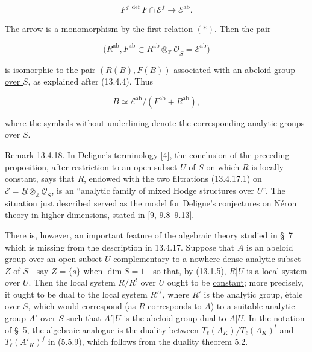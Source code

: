 \begin{equation*}
 \underline F^f\stackrel{\mathrm{def}}{=}
 \underline F\cap\mathcal E^f\longrightarrow\mathcal E^{\mathrm{ab}}.
\end{equation*}

\noindent
The arrow is a monomorphism by the first relation $(*)$.
\underline{Then the pair}

\begin{equation*}
 \bigl(\underline R^{\mathrm{ab}},
 \underline F^{\mathrm{ab}}\subset
 \underline R^{\mathrm{ab}}\otimes_{\mathbb Z}
 \underline{\mathcal O}_S=\mathcal E^{\mathrm{ab}}\bigr)
\end{equation*}

\noindent
\underline{is isomorphic to the pair}
$(\underline R(B),\underline F(B))$
\underline{associated with an abeloid group over $S$}, as explained
after (13.4.4).  Thus

\begin{equation*}
 B\simeq\mathcal E^{\mathrm{ab}}/
 (F^{\mathrm{ab}}+R^{\mathrm{ab}}),
\end{equation*}

\noindent
where the symbols without underlining denote the corresponding analytic
groups over $S$.

\medskip
\noindent
\underline{Remark 13.4.18.} In Deligne's terminology [4], the conclusion
of the preceding proposition, after restriction to an open subset $U$
of $S$ on which $R$ is locally constant, says that $R$, endowed with the
two filtrations (13.4.17.1) on
$\mathcal E=\underline R\otimes_{\mathbb Z}\underline{\mathcal O}_S$,
is an ``analytic family of mixed Hodge structures over $U$''.  The
situation just described served as the model for Deligne's conjectures
on N\'eron theory in higher dimensions, stated in [9, 9.8--9.13].

There is, however, an important feature of the algebraic theory studied
in \S~7 which is missing from the description in 13.4.17.  Suppose that
$A$ is an abeloid group over an open subset $U$ complementary to a
nowhere-dense analytic subset $Z$ of $S$---say $Z=\{s\}$ when
$\dim S=1$---so that, by (13.1.5), $R|U$ is a local system over $U$.
Then the local system $R/R^t$ over $U$ ought to be \underline{constant};
more precisely, it ought to be dual to the local system ${R'}^f$, where
$R'$ is the analytic group, \`etale over $S$, which would correspond
(as $R$ corresponds to $A$) to a suitable analytic group $A'$ over $S$
such that $A'|U$ is the abeloid group dual to $A|U$.  In the notation of
\S~5, the algebraic analogue is the duality between
$T_\ell(A_K)/T_\ell(A_K)^t$ and $T_\ell(A'_K)^f$ in (5.5.9), which
follows from the duality theorem 5.2.

